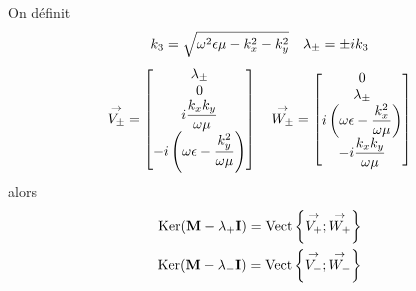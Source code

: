     \begin{prop}
        On définit
        \begin{equation}
            k_3=\sqrt{\omega^2\epsilon\mu - k_x^2 -k_y^2} \quad \lambda_\pm=\pm i k_3
        \end{equation}
        \begin{equation}
            {\overset{\rightarrow}{V_\pm}} =
            \begin{bmatrix}
            \lambda_\pm \\
                0 \\
                i\dfrac{k_xk_y}{\omega\mu} \\
                -i\left(\omega\epsilon - \dfrac{k_y^2}{\omega\mu}\right)
            \end{bmatrix}
            \quad
            {\overset{\rightarrow}{W_\pm}} =
                \begin{bmatrix}
                0 \\
                \lambda_\pm \\
                i\left(\omega\epsilon - \dfrac{k_x^2}{\omega\mu}\right) \\
                -i\dfrac{k_xk_y}{\omega\mu}
            \end{bmatrix}
        \end{equation}
        alors
        \begin{subequations}
            \begin{align}
                \operatorname{Ker}(\mathbf{M}-\lambda_+\mathbf{I})=\operatorname{Vect}\left\lbrace{\overset{\rightarrow}{V_+}};{\overset{\rightarrow}{W_+}}\right\rbrace\\
                \operatorname{Ker}(\mathbf{M}-\lambda_-\mathbf{I})=\operatorname{Vect}\left\lbrace{\overset{\rightarrow}{V_-}};{\overset{\rightarrow}{W_-}}\right\rbrace
            \end{align}
        \end{subequations}
    \end{prop}

